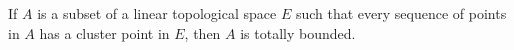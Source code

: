 If $A$ is a subset of a linear topological space $E$ such that every sequence of points in $A$ has a cluster point in $E$, then $A$ is totally bounded.
